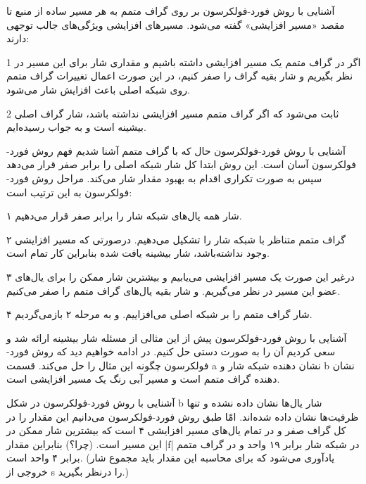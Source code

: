 \begin{itemframe}{آشنایی با روش فورد-فولکرسون}
\itm
بر روی گراف متمم به هر مسیر ساده از منبع تا مقصد «مسیر افزایشی»
گفته می‌شود.
\itm
مسیر‌های افزایشی ویژگی‌های جالب توجهی دارند:
\item[1]
اگر در گراف متمم یک مسیر افزایشی داشته باشیم و مقداری شار برای این مسیر در نظر بگیریم و شار بقیه گراف را صفر کنیم، در این صورت اعمال تغییرات گراف متمم روی شبکه اصلی باعث افزایش شار می‌شود.
\item[2]
ثابت می‌شود که اگر گراف متمم مسیر افزایشی نداشته باشد، شار گراف اصلی بیشینه است و به جواب رسیده‌ایم.
\end{itemframe}


\begin{itemframe}{آشنایی با روش فورد-فولکرسون}
\itm
حال که با گراف متمم آشنا شدیم فهم روش فورد-فولکرسون آسان است. این روش ابتدا کل شار شبکه اصلی را برابر صفر قرار می‌دهد سپس به صورت تکراری اقدام به بهبود مقدار شار می‌کند. مراحل روش فورد-فولکرسون به این ترتیب است:
\item[۱]
شار همه یال‌های شبکه شار را برابر صفر قرار می‌دهیم.
\item[۲]
گراف متمم متناظر با شبکه شار را تشکیل می‌دهیم. درصورتی که مسیر افزایشی وجود نداشته‌باشد، شار بیشینه یافت شده بنابراین کار تمام است.
\item[۳]
درغیر این صورت یک مسیر افزایشی می‌یابیم و بیشترین شار ممکن را برای یال‌های عضو این مسیر در نظر می‌گیریم. و شار بقیه یال‌های گراف متمم را صفر می‌کنیم.
\item[۴]
شار گراف متمم را بر شبکه اصلی می‌افزاییم. و به مرحله ۲ بازمی‌گردیم.

\end{itemframe}

\begin{itemframe}{آشنایی با روش فورد-فولکرسون}
\itm
پیش از این مثالی از مسئله شار بیشینه ارائه شد و سعی کردیم آن را به صورت دستی حل کنیم. در ادامه خواهیم دید که روش فورد-فولکرسون چگونه این مثال را حل می‌کند.
\itm
قسمت a نشان دهنده شبکه شار و b نشان دهنده گراف متمم است و مسیر آبی رنگ یک مسیر افزایشی است.
\end{itemframe}

\begin{itemframe}{آشنایی با روش فورد-فولکرسون}
\itm
در شکل b شار یال‌ها نشان داده نشده و تنها ظرفیت‌ها نشان داده شده‌اند. امّا طبق روش فورد-فولکرسون می‌دانیم این مقدار را در کل گراف صفر و در تمام یال‌های مسیر افزایشی ۴ است که بیشترین شار ممکن در این مسیر است. (چرا؟)
\itm
بنابراین مقدار |f| در شبکه شار برابر ۱۹ واحد و در گراف متمم برابر ۴ واحد است. (يادآوری می‌شود که برای محاسبه این مقدار باید مجموع شار خروجی از s را درنظر بگیرید.)
\end{itemframe}

